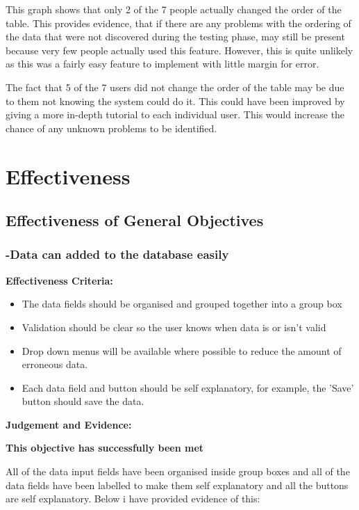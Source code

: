 This graph shows that only 2 of the 7 people actually changed the order of the table. This provides evidence, that if there are any problems with the ordering of the data that were not discovered during the testing phase, may still be present because very few people actually used this feature. However, this is quite unlikely as this was a fairly easy feature to implement with little margin for error.

The fact that 5 of the 7 users did not change the order of the table may be due to them not knowing the system could do it. This could have been improved by giving a more in-depth tutorial to each individual user. This would increase the chance of any unknown problems to be identified.



\pagebreak
\section{Effectiveness}

\subsection{Effectiveness of General Objectives}

\subsubsection{-Data can added to the database easily}

\textbf{Effectiveness Criteria:}\newline
\begin{itemize}
	\item{The data fields should be organised and grouped together into a group box}
	\item{Validation should be clear so the user knows when data is or isn't valid}
	\item{Drop down menus will be available where possible to reduce the amount of erroneous data.}
	\item{Each data field and button should be self explanatory, for example, the 'Save' button should save the data.}
\end{itemize}
\textbf{Judgement and Evidence:} \newline

\textbf{\large{This objective has successfully been met}}

All of the data input fields have been organised inside group boxes and all of the data fields have been labelled to make them self explanatory and all the buttons are self explanatory. Below i have provided evidence of this:

